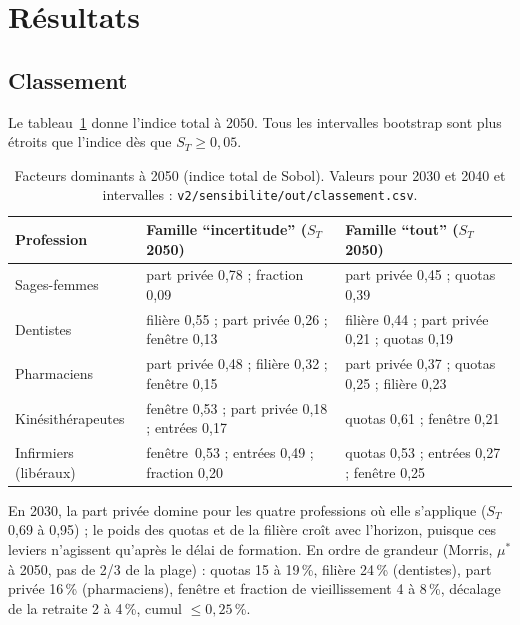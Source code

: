 \documentclass[11pt]{article}
\begin{document}
\section{Résultats}\label{sec:res}
\subsection{Classement}
Le tableau~\ref{tab:st} donne l'indice total à 2050. Tous les intervalles bootstrap sont plus étroits que l'indice
dès que $S_T \ge 0{,}05$\mesure{}.

\begin{table}[h]\centering\small
\begin{tabular}{p{2.9cm}p{5.8cm}p{5.8cm}}
\toprule
Profession & Famille \enquote{incertitude} ($S_T$ 2050) & Famille \enquote{tout} ($S_T$ 2050) \\
\midrule
Sages-femmes & part privée 0,78\mesure{} ; fraction 0,09\mesure{} & part privée 0,45\mesure{} ; quotas 0,39\mesure{} \\
Dentistes & filière 0,55\mesure{} ; part privée 0,26\mesure{} ; fenêtre 0,13\mesure{} & filière 0,44\mesure{} ; part privée 0,21\mesure{} ; quotas 0,19\mesure{} \\
Pharmaciens & part privée 0,48\mesure{} ; filière 0,32\mesure{} ; fenêtre 0,15\mesure{} & part privée 0,37\mesure{} ; quotas 0,25\mesure{} ; filière 0,23\mesure{} \\
Kinésithérapeutes & fenêtre 0,53\mesure{} ; part privée 0,18\mesure{} ; entrées 0,17\mesure{} & quotas 0,61\mesure{} ; fenêtre 0,21\mesure{} \\
Infirmiers (libéraux) & fenêtre~0,53\mesure{} ; entrées 0,49\mesure{} ; fraction 0,20\mesure{} & quotas 0,53\mesure{} ; entrées 0,27\mesure{} ; fenêtre 0,25\mesure{} \\
\bottomrule
\end{tabular}
\caption{Facteurs dominants à 2050 (indice total de Sobol). Valeurs pour 2030 et 2040 et intervalles :
\texttt{v2/sensibilite/out/classement.csv}.}\label{tab:st}
\end{table}

En 2030, la part privée domine pour les quatre professions où elle s'applique ($S_T$ 0,69 à 0,95\mesure{}) ; le
poids des quotas et de la filière croît avec l'horizon, puisque ces leviers n'agissent qu'après le délai de
formation. En ordre de grandeur (Morris, $\mu^*$ à 2050, pas de 2/3 de la plage) : quotas 15 à 19\,\%\mesure{},
filière 24\,\%\mesure{} (dentistes), part privée 16\,\%\mesure{} (pharmaciens), fenêtre et fraction de
vieillissement 4 à 8\,\%\mesure{}, décalage de la retraite 2 à 4\,\%\mesure{}, cumul $\le 0{,}25$\,\%\mesure{}.
\end{document}
